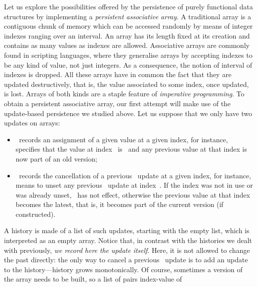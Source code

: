 \hspace*{-5pt} Let us explore the possibilities offered by the
persistence of purely functional data structures by implementing a
\emph{persistent associative array}. A traditional array is a
contiguous chunk of memory which can be accessed randomly by means of
integer indexes ranging over an interval. An array has its length
fixed at its creation and contains as many values as indexes are
allowed. Associative arrays are commonly found in scripting languages,
where they generalise arrays by accepting indexes to be any kind of
value, not just integers. As a consequence, the notion of interval of
indexes is dropped. All these arrays have in common the fact that they
are updated destructively, that is, the value associated to some
index, once updated, is lost. Arrays of both kinds are a staple
feature of \emph{imperative programming}. To obtain a persistent
associative array, our first attempt will make use of the
update\hyp{}based persistence we studied above. Let us suppose that we
only have two updates on arrays:
\begin{itemize}

  \item {}~records an assignment of a given value at a
    given index, for instance,  specifies that
    the value at index~ is~ and any previous
    value at that index is now part of an old version;

  \item {}~records the cancellation of a previous
    ~update at a given index, for instance,
     means to unset any previous
    ~update at index~. If the index was not in
    use or was already unset, ~has not effect,
    otherwise the previous value at that index becomes the latest,
    that is, it becomes part of the current version (if constructed).

\end{itemize}
A history is made of a list of such updates, starting with the empty
list, which is interpreted as an empty array. Notice that, in contrast
with the histories we dealt with previously, \emph{we record here the
   update itself}. Here, it is not allowed to change
the past directly: the only way to cancel a previous
~update is to add an  update to the
history---history grows monotonically. Of course, sometimes a version
of the array needs to be built, so a list of pairs index\hyp{}value of
